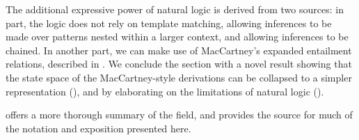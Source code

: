The additional expressive power of natural logic is derived from two
  sources: in part, the logic does not rely on template matching,
  allowing inferences to be made over patterns nested within a larger
  context, and allowing inferences to be chained.
In another part, we can make use of MacCartney's expanded entailment
  relations, described in .
We conclude the section with a novel result showing that the state
  space of the MacCartney-style derivations can be collapsed to a
  simpler representation (), and by
  elaborating on the limitations of natural logic ().

 offers a more thorough summary of the
  field, and provides the source for much of the notation and
  exposition presented here.
